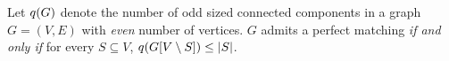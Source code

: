 \documentclass[11pt]{article}
\begin{document}
\begin{lemma}\label{lemma:tutte-criterion}
Let $q(G)$ denote the number of odd sized connected components in a graph $G=(V,E)$ with \emph{even} number of vertices.
$G$ admits a perfect matching \emph{if and only if} for every $S \subseteq V$, $q(G[V \setminus S]) \leq |S|$.
\end{lemma}

\end{document}
